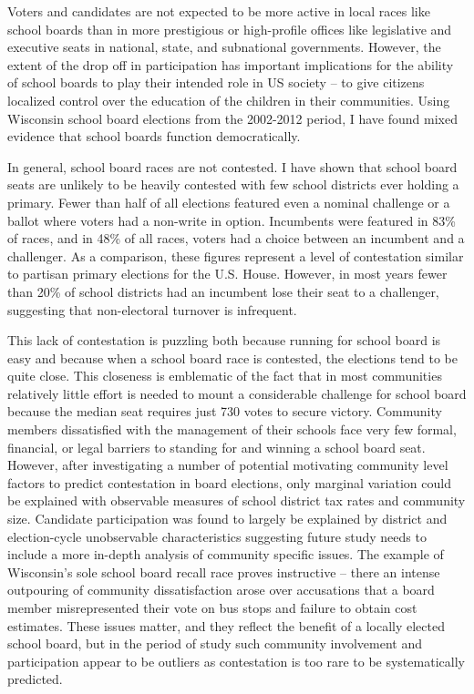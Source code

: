 Voters and candidates are not expected to be more active in local races like 
school boards than in more prestigious or high-profile offices like legislative 
and executive seats in national, state, and subnational governments. However, 
the extent of the drop off in participation has important implications for the 
ability of school boards to play their intended role in US society -- to give 
citizens localized control over the education of the children in their communities. 
Using Wisconsin school board elections from the 2002-2012 period, I have found mixed 
evidence that school boards function democratically. 


In general, school board races are not contested. I have shown 
that school board seats are unlikely to be heavily contested with few school 
districts ever holding a primary. Fewer than half of all elections featured even 
a nominal challenge or a ballot where voters had a non-write in option. Incumbents 
were featured in 83\% of races, and in 48\% of all races, voters had a choice between 
an incumbent and a challenger. As a comparison, these figures represent a level of 
contestation similar to partisan primary elections for the U.S. House. However, in 
most years fewer than 20\% of school districts had an incumbent lose their seat to 
a challenger, suggesting that non-electoral turnover is infrequent. 

This lack of contestation is puzzling both because running for school board is 
easy and because when a school board race is contested, the elections tend to be 
quite close. This closeness is emblematic of 
the fact that in most communities relatively little effort is needed to mount a 
considerable challenge for school board because the median seat requires just 
730 votes to secure victory. Community members dissatisfied with the management 
of their schools face very few formal, financial, or legal barriers to standing for 
and winning a school board seat. However, after investigating a number of potential 
motivating community level factors to predict contestation in board elections, 
only marginal variation could be explained with observable measures of school district 
tax rates and community size. Candidate participation was found to largely 
be explained by district and election-cycle unobservable characteristics suggesting 
future study needs to include a more in-depth analysis of community specific issues. 
The example of Wisconsin's sole school board recall race proves instructive -- there 
an intense outpouring of community dissatisfaction arose over accusations that a board 
member misrepresented their vote on bus stops and failure to obtain cost estimates. 
These issues matter, and they reflect the benefit of a locally elected school 
board, but in the period of study such community involvement and participation 
appear to be outliers as contestation is too rare to be systematically predicted. 

